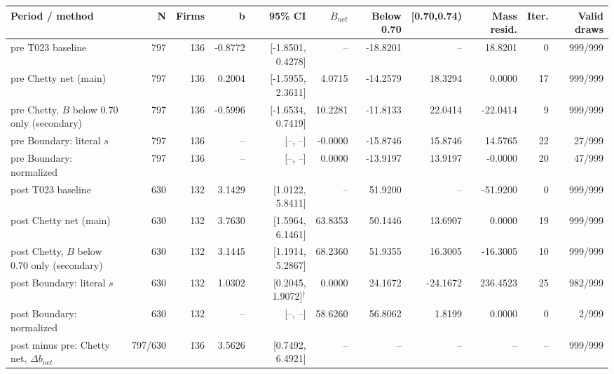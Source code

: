 \begingroup\scriptsize\setlength{\tabcolsep}{3pt}
\begin{threeparttable}
\begin{tabular}{lrrrrrrrrrr}
\toprule
Period / method & N & Firms & b & 95\% CI & $B_{net}$ & Below 0.70 & [0.70,0.74) & Mass resid. & Iter. & Valid draws \\
\midrule
pre T023 baseline & 797 & 136 & -0.8772 & [-1.8501, 0.4278] & -- & -18.8201 & -- & 18.8201 & 0 & 999/999 \\
pre Chetty net (main) & 797 & 136 & 0.2004 & [-1.5955, 2.3611] & 4.0715 & -14.2579 & 18.3294 & 0.0000 & 17 & 999/999 \\
pre Chetty, $B$ below 0.70 only (secondary) & 797 & 136 & -0.5996 & [-1.6534, 0.7419] & 10.2281 & -11.8133 & 22.0414 & -22.0414 & 9 & 999/999 \\
pre Boundary: literal $s$ & 797 & 136 & -- & [--, --] & -0.0000 & -15.8746 & 15.8746 & 14.5765 & 22 & 27/999 \\
pre Boundary: normalized & 797 & 136 & -- & [--, --] & 0.0000 & -13.9197 & 13.9197 & -0.0000 & 20 & 47/999 \\
post T023 baseline & 630 & 132 & 3.1429 & [1.0122, 5.8411] & -- & 51.9200 & -- & -51.9200 & 0 & 999/999 \\
post Chetty net (main) & 630 & 132 & 3.7630 & [1.5964, 6.1461] & 63.8353 & 50.1446 & 13.6907 & 0.0000 & 19 & 999/999 \\
post Chetty, $B$ below 0.70 only (secondary) & 630 & 132 & 3.1445 & [1.1914, 5.2867] & 68.2360 & 51.9355 & 16.3005 & -16.3005 & 10 & 999/999 \\
post Boundary: literal $s$ & 630 & 132 & 1.0302 & [0.2045, 1.9072]$^{\dagger}$ & 0.0000 & 24.1672 & -24.1672 & 236.4523 & 25 & 982/999 \\
post Boundary: normalized & 630 & 132 & -- & [--, --] & 58.6260 & 56.8062 & 1.8199 & 0.0000 & 0 & 2/999 \\
post minus pre: Chetty net, $\Delta b_{net}$ & 797/630 & 136 & 3.5626 & [0.7492, 6.4921] & -- & -- & -- & -- & -- & 999/999 \\
\bottomrule
\end{tabular}
\begin{tablenotes}[flushleft]\footnotesize

\end{tablenotes}
\end{threeparttable}
